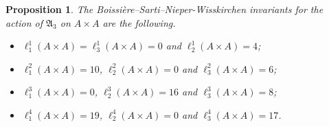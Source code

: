 \documentclass[a4paper]{article}
\newtheorem{prop}{Proposition}
\theoremstyle{remark}
\begin{document}
\begin{prop}\label{AA}
The Boissi\`ere--Sarti--Nieper-Wisskirchen invariants for the action of $\mathfrak{A}_3$ on $A\times A$ are the following.
\begin{itemize}
\item[(i)]
$\ell_1^1(A\times A)=\ell_3^1(A\times A)=0$ and $\ell_2^1(A\times A)=4$;
\item[(ii)]
$\ell_1^2(A\times A)=10$, $\ell_2^2(A\times A)=0$ and  $\ell_3^2(A\times A)=6$;
\item[(iii)]
$\ell_1^3(A\times A)=0$, $\ell_2^3(A\times A)=16$ and  $\ell_3^3(A\times A)=8$;
\item[(iv)]
$\ell_1^4(A\times A)=19$, $\ell_2^4(A\times A)=0$ and  $\ell_3^4(A\times A)=17$.
\end{itemize}
\end{prop}
\end{document}
